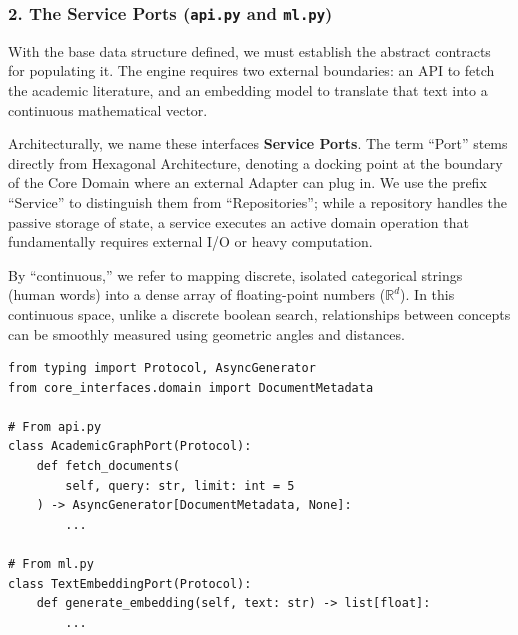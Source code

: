 \subsubsection*{2. The Service Ports (\texttt{api.py} and \texttt{ml.py})}

With the base data structure defined, we must establish the abstract contracts for populating it. The engine requires two external boundaries: an API to fetch the academic literature, and an embedding model to translate that text into a continuous mathematical vector.

Architecturally, we name these interfaces \textbf{Service Ports}. The term ``Port'' stems directly from Hexagonal Architecture, denoting a docking point at the boundary of the Core Domain where an external Adapter can plug in. We use the prefix ``Service'' to distinguish them from ``Repositories''; while a repository handles the passive storage of state, a service executes an active domain operation that fundamentally requires external I/O or heavy computation.

By ``continuous,'' we refer to mapping discrete, isolated categorical strings (human words) into a dense array of floating-point numbers ($\mathbb{R}^d$). In this continuous space, unlike a discrete boolean search, relationships between concepts can be smoothly measured using geometric angles and distances.

\begin{lstlisting}[caption={External Service Protocols}]
from typing import Protocol, AsyncGenerator
from core_interfaces.domain import DocumentMetadata

# From api.py
class AcademicGraphPort(Protocol):
    def fetch_documents(
        self, query: str, limit: int = 5
    ) -> AsyncGenerator[DocumentMetadata, None]:
        ...

# From ml.py
class TextEmbeddingPort(Protocol):
    def generate_embedding(self, text: str) -> list[float]:
        ...
\end{lstlisting}

